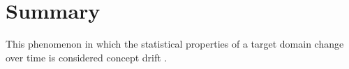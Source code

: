 \section{Summary}

This phenomenon in which the statistical properties of a target domain change over time is considered concept drift \cite{desai_issue_2021}.
